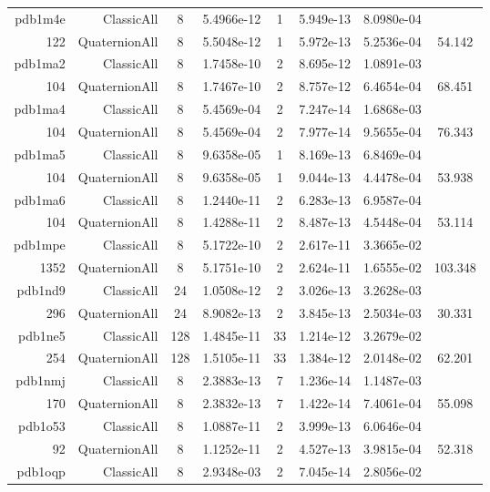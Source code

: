 \begin{xltabular}{\textwidth}{r|rcS[table-format=1.4e+2]cS[table-format=1.3e+2]S[table-format=1.4e+2]S[table-format=-1.3]}
pdb1m4e & ClassicAll & 8 & 5.4966e-12 & 1 & 5.949e-13 & 8.0980e-04 & \\
122 & QuaternionAll & 8 & 5.5048e-12 & 1 & 5.972e-13 & 5.2536e-04 & 54.142\\  \addlinespace
pdb1ma2 & ClassicAll & 8 & 1.7458e-10 & 2 & 8.695e-12 & 1.0891e-03 & \\
104 & QuaternionAll & 8 & 1.7467e-10 & 2 & 8.757e-12 & 6.4654e-04 & 68.451\\  \addlinespace
pdb1ma4 & ClassicAll & 8 & 5.4569e-04 & 2 & 7.247e-14 & 1.6868e-03 & \\
104 & QuaternionAll & 8 & 5.4569e-04 & 2 & 7.977e-14 & 9.5655e-04 & 76.343\\  \addlinespace
pdb1ma5 & ClassicAll & 8 & 9.6358e-05 & 1 & 8.169e-13 & 6.8469e-04 & \\
104 & QuaternionAll & 8 & 9.6358e-05 & 1 & 9.044e-13 & 4.4478e-04 & 53.938\\  \addlinespace
pdb1ma6 & ClassicAll & 8 & 1.2440e-11 & 2 & 6.283e-13 & 6.9587e-04 & \\
104 & QuaternionAll & 8 & 1.4288e-11 & 2 & 8.487e-13 & 4.5448e-04 & 53.114\\  \addlinespace
pdb1mpe & ClassicAll & 8 & 5.1722e-10 & 2 & 2.617e-11 & 3.3665e-02 & \\
1352 & QuaternionAll & 8 & 5.1751e-10 & 2 & 2.624e-11 & 1.6555e-02 & 103.348\\  \addlinespace
pdb1nd9 & ClassicAll & 24 & 1.0508e-12 & 2 & 3.026e-13 & 3.2628e-03 & \\
296 & QuaternionAll & 24 & 8.9082e-13 & 2 & 3.845e-13 & 2.5034e-03 & 30.331\\  \addlinespace
pdb1ne5 & ClassicAll & 128 & 1.4845e-11 & 33 & 1.214e-12 & 3.2679e-02 & \\
254 & QuaternionAll & 128 & 1.5105e-11 & 33 & 1.384e-12 & 2.0148e-02 & 62.201\\  \addlinespace
pdb1nmj & ClassicAll & 8 & 2.3883e-13 & 7 & 1.236e-14 & 1.1487e-03 & \\
170 & QuaternionAll & 8 & 2.3832e-13 & 7 & 1.422e-14 & 7.4061e-04 & 55.098\\  \addlinespace
pdb1o53 & ClassicAll & 8 & 1.0887e-11 & 2 & 3.999e-13 & 6.0646e-04 & \\
92 & QuaternionAll & 8 & 1.1252e-11 & 2 & 4.527e-13 & 3.9815e-04 & 52.318\\  \addlinespace
pdb1oqp & ClassicAll & 8 & 2.9348e-03 & 2 & 7.045e-14 & 2.8056e-02 & \\

\end{xltabular}
